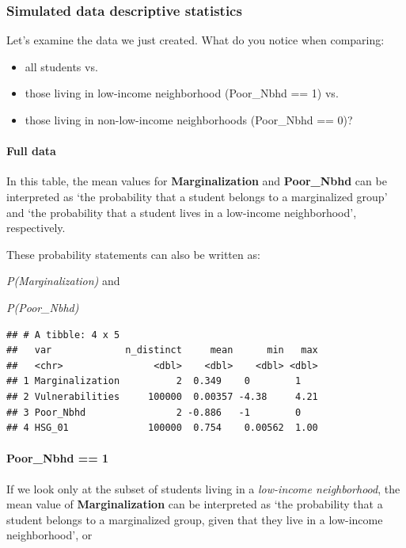\documentclass[
]{article}
\providecommand{\tightlist}{%
  \setlength{\itemsep}{0pt}\setlength{\parskip}{0pt}}
\begin{document}
\subsubsection{Simulated data descriptive
statistics}\label{simulated-data-descriptive-statistics}

Let's examine the data we just created. What do you notice when
comparing:

\begin{itemize}
\tightlist
\item
  all students vs.~
\item
  those living in low-income neighborhood (Poor\_Nbhd == 1) vs.~
\item
  those living in non-low-income neighborhoods (Poor\_Nbhd == 0)?
\end{itemize}

\paragraph{Full data}\label{full-data}

In this table, the mean values for \textbf{Marginalization} and
\textbf{Poor\_Nbhd} can be interpreted as `the probability that a
student belongs to a marginalized group' and `the probability that a
student lives in a low-income neighborhood', respectively.

These probability statements can also be written as:

\emph{P(Marginalization)} and

\emph{P(Poor\_Nbhd)}

\begin{verbatim}
## # A tibble: 4 x 5
##   var             n_distinct     mean      min   max
##   <chr>                <dbl>    <dbl>    <dbl> <dbl>
## 1 Marginalization          2  0.349    0        1   
## 2 Vulnerabilities     100000  0.00357 -4.38     4.21
## 3 Poor_Nbhd                2 -0.886   -1        0   
## 4 HSG_01              100000  0.754    0.00562  1.00
\end{verbatim}

\paragraph{Poor\_Nbhd == 1}\label{poor_nbhd-1}

If we look only at the subset of students living in a \emph{low-income
neighborhood}, the mean value of \textbf{Marginalization} can be
interpreted as `the probability that a student belongs to a marginalized
group, given that they live in a low-income neighborhood', or
\end{document}
